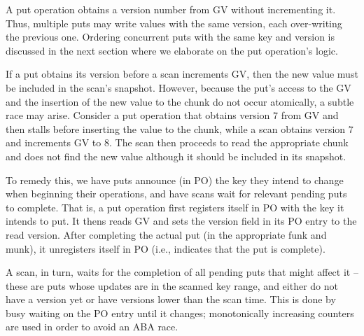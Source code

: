 

A put operation obtains a version number from GV without incrementing it. Thus, multiple puts may write values with the same version, each over-writing the previous one. Ordering concurrent puts with the same key and version is discussed in the next section where we elaborate on the put operation's logic.

If a put obtains its version before a scan increments GV, then the new value must be included in the scan's snapshot. 
However, because the put's access to the GV and the insertion of the new value to the chunk do not occur atomically,
a subtle race may arise. Consider a put operation that obtains version $7$ from GV and then stalls before
inserting the value to the chunk, while a scan obtains version $7$ and increments GV to $8$. The scan then proceeds 
to read the appropriate chunk and does not find the new value although it should be included in its snapshot.

To remedy this, we have puts announce (in PO) the key they intend to change when beginning their operations, and have scans wait for relevant pending puts to complete. That is,
a put operation first registers itself in PO with the key it intends to put.
It thens reads GV and sets the version field in its PO entry to the read version. 
After completing the actual put (in the appropriate funk and munk), it unregisters itself in PO (i.e., 
indicates that the put is complete).

A scan, in turn, 
waits for the completion of all pending puts  that might affect it  -- these are puts whose updates 
are in the scanned key range, and either do not have a version yet or have versions lower than the scan time.
This is done by busy waiting on the PO entry until it changes; monotonically increasing counters are used 
in order to avoid an  ABA race. 

